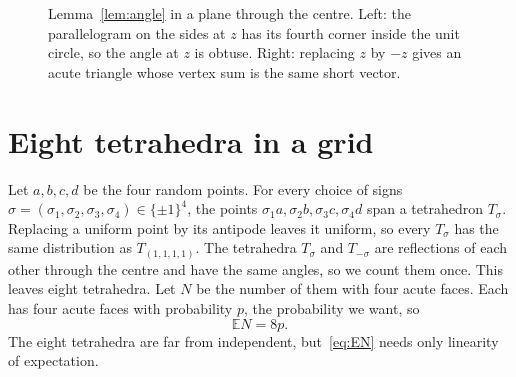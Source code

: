 \documentclass[11pt,a4paper]{article}
\newcommand{\E}{\mathbb{E}}
\begin{document}
\begin{figure}[ht]
\centering
{}
\caption{Lemma~\ref{lem:angle} in a plane through the centre. Left: the
parallelogram on the sides at $z$ has its fourth corner inside the unit
circle, so the angle at $z$ is obtuse. Right: replacing $z$ by $-z$ gives
an acute triangle whose vertex sum is the same short vector.}
\label{fig:angle}
\end{figure}

\section{Eight tetrahedra in a grid}\label{sec:eight}

Let $a,b,c,d$ be the four random points. For every choice of signs
$\sigma=(\sigma_1,\sigma_2,\sigma_3,\sigma_4)\in\{\pm1\}^4$, the points
$\sigma_1a,\sigma_2b,\sigma_3c,\sigma_4d$ span a tetrahedron $T_\sigma$.
Replacing a uniform point by its antipode leaves it uniform, so every
$T_\sigma$ has the same distribution as $T_{(1,1,1,1)}$. The tetrahedra
$T_\sigma$ and $T_{-\sigma}$ are reflections of each other through the
centre and have the same angles, so we count them once. This leaves
eight tetrahedra. Let $N$ be the number of them with four acute faces.
Each has four acute faces with probability $p$, the probability we want, so
\begin{equation}\label{eq:EN}
 \E N=8p.
\end{equation}
The eight tetrahedra are far from independent, but~\eqref{eq:EN} needs only
linearity of expectation.
\end{document}
